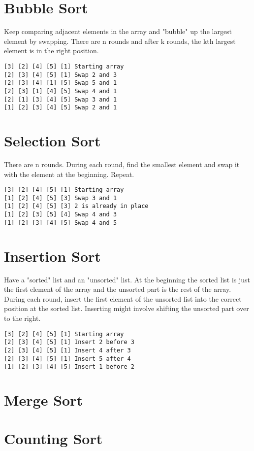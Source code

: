 \documentclass{article}
\begin{document}
\section{Bubble Sort}
Keep comparing adjacent elements in the array and "bubble" up the largest element by swapping.
There are n rounds and after k rounds, the kth largest element is in the right position.
\begin{lstlisting}
[3] [2] [4] [5] [1] Starting array
[2] [3] [4] [5] [1] Swap 2 and 3
[2] [3] [4] [1] [5] Swap 5 and 1
[2] [3] [1] [4] [5] Swap 4 and 1
[2] [1] [3] [4] [5] Swap 3 and 1
[1] [2] [3] [4] [5] Swap 2 and 1
\end{lstlisting}

\section{Selection Sort}
There are n rounds. During each round, find the smallest element and swap it with the element at the beginning. Repeat.
\begin{lstlisting}
[3] [2] [4] [5] [1] Starting array
[1] [2] [4] [5] [3] Swap 3 and 1
[1] [2] [4] [5] [3] 2 is already in place
[1] [2] [3] [5] [4] Swap 4 and 3
[1] [2] [3] [4] [5] Swap 4 and 5
\end{lstlisting}

\section{Insertion Sort}
Have a "sorted" list and an "unsorted" list.
At the beginning the sorted list is just the first element of the array and the unsorted part is the rest of the array.
During each round, insert the first element of the unsorted list into the correct position at the sorted list.
Inserting might involve shifting the unsorted part over to the right.
\begin{lstlisting}
[3] [2] [4] [5] [1] Starting array
[2] [3] [4] [5] [1] Insert 2 before 3
[2] [3] [4] [5] [1] Insert 4 after 3
[2] [3] [4] [5] [1] Insert 5 after 4
[1] [2] [3] [4] [5] Insert 1 before 2
\end{lstlisting}

\section{Merge Sort}
\section{Counting Sort}
\end{document}
